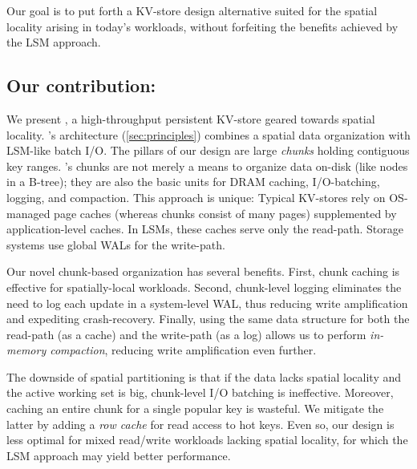 Our  goal is to 
put forth a KV-store design alternative  suited for the 
spatial locality arising in today's  workloads, without forfeiting the benefits achieved by the LSM approach.




\subsection{Our contribution: \sys}

We present \sys, a high-throughput persistent KV-store geared towards spatial locality. 
\sys's  architecture (\cref{sec:principles}) combines a spatial data organization with LSM-like  batch I/O. 
The pillars of our design are large \emph{chunks} holding contiguous key ranges. 
\sys's chunks are not merely  a means to organize data on-disk (like nodes in a B-tree); they 
are also the basic units for DRAM caching, I/O-batching, logging, and compaction. 
This approach is unique:  Typical KV-stores rely on OS-managed page caches (whereas chunks consist of many pages)  
supplemented by application-level caches. In LSMs, these caches serve only the read-path. 
Storage systems use global WALs for the write-path.

Our novel chunk-based organization has several benefits. 
First, chunk caching is effective for spatially-local workloads.
Second, chunk-level logging eliminates the need to log each update in a system-level WAL, thus 
reducing write amplification and expediting crash-recovery. 
Finally, using the same data structure for both the read-path (as a cache) and the write-path
(as a log) allows us to perform \emph{in-memory compaction}, reducing write amplification even further.

The downside of spatial partitioning is that if the data lacks spatial locality and the active working set is big, 
chunk-level I/O batching is ineffective. Moreover, 
caching an entire chunk for a single popular key is wasteful. 
We mitigate the latter by adding a \emph{row cache} for read access to hot keys. Even so, 
our design is less optimal for mixed read/write workloads lacking spatial locality, for which the LSM approach may yield better performance.  


